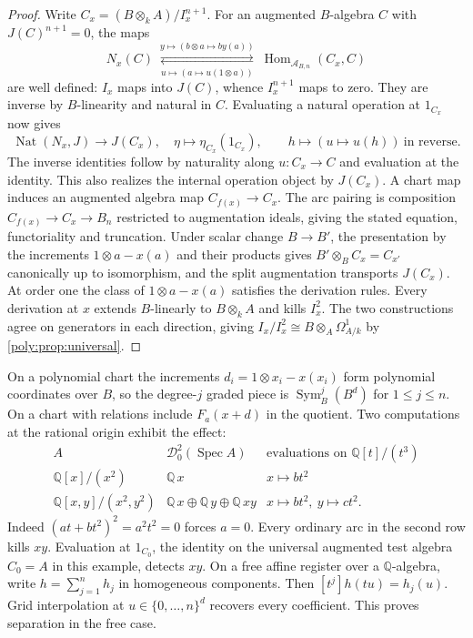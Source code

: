 \documentclass[11pt,a4paper]{article}
\theoremstyle{definition}
\theoremstyle{remark}\newaliascnt{remark}{theorem}
\newcommand{\Q}{\mathbb Q}
\newcommand{\Hom}{\operatorname{Hom}}
\newcommand{\Sym}{\operatorname{Sym}}
\newcommand{\Spec}{\operatorname{Spec}}
\numberwithin{equation}{section}
\begin{document}
\begin{proof}
Write \(C_x=(B\otimes_k A)/I_x^{n+1}\). For an augmented \(B\)-algebra \(C\) with \(J(C)^{n+1}=0\), the maps
\[
 N_x(C)\ \underset{u\mapsto(a\mapsto u(1\otimes a))}{
                  \overset{y\mapsto(b\otimes a\mapsto by(a))}{\rightleftarrows}}\
 \Hom_{\mathcal A_{B,n}}(C_x,C)
\]
are well defined: \(I_x\) maps into \(J(C)\), whence \(I_x^{n+1}\) maps to zero. They are inverse by \(B\)-linearity and natural in \(C\). Evaluating a natural operation at \(1_{C_x}\) now gives
\[
 \operatorname{Nat}(N_x,J)\longrightarrow J(C_x),\quad
 \eta\longmapsto\eta_{C_x}(1_{C_x}),\qquad
 h\longmapsto(u\longmapsto u(h))\ \text{in reverse}.
\]
The inverse identities follow by naturality along \(u:C_x\to C\) and evaluation at the identity. This also realizes the internal operation object by \(J(C_x)\). A chart map induces an augmented algebra map \(C_{f(x)}\to C_x\). The arc pairing is composition
\(C_{f(x)}\to C_x\to B_n\) restricted to augmentation ideals, giving the stated equation, functoriality and truncation. Under scalar change \(B\to B'\), the presentation by the increments \(1\otimes a-x(a)\) and their products gives \(B'\otimes_B C_x=C_{x'}\) canonically up to isomorphism, and the split augmentation transports \(J(C_x)\). At order one the class of \(1\otimes a-x(a)\) satisfies the derivation rules. Every derivation at \(x\) extends \(B\)-linearly to \(B\otimes_k A\) and kills \(I_x^2\). The two constructions agree on generators in each direction, giving \(I_x/I_x^2\cong B\otimes_A\Omega^1_{A/k}\) by \cref{poly:prop:universal}.
\end{proof}
On a polynomial chart the increments \(d_i=1\otimes x_i-x(x_i)\) form polynomial coordinates over \(B\), so the degree-\(j\) graded piece is \(\Sym_B^j(B^d)\) for \(1\le j\le n\). On a chart with relations include \(F_a(x+d)\) in the quotient. Two computations at the rational origin exhibit the effect:
\[
\begin{array}{c|c|c}
 A &\mathcal D^2_0(\Spec A)&\text{evaluations on }\Q[t]/(t^3)\\ \hline
 \Q[x]/(x^2)&\Q\,x& x\mapsto b t^2\\
 \Q[x,y]/(x^2,y^2)&\Q\,x\oplus\Q\,y\oplus\Q\,xy
       &x\mapsto b t^2,\ y\mapsto c t^2 .
\end{array}
\]
Indeed \((at+bt^2)^2=a^2t^2=0\) forces \(a=0\). Every ordinary arc in the second row kills \(xy\). Evaluation at \(1_{C_0}\), the identity on the universal augmented test algebra \(C_0=A\) in this example, detects \(xy\). On a free affine register over a \(\Q\)-algebra, write \(h=\sum_{j=1}^nh_j\) in homogeneous components. Then \([t^j]h(tu)=h_j(u)\). Grid interpolation at \(u\in\{0,\ldots,n\}^d\) recovers every coefficient. This proves separation in the free case.
\end{document}
